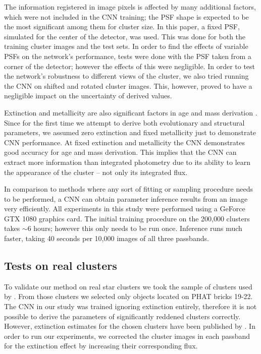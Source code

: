 \documentclass{aa}
\begin{document}
The information registered in image pixels is affected by many additional factors, which were not included in the CNN training; the PSF shape is expected to be the most significant among them for cluster size. In this paper, a fixed PSF, simulated for the center of the detector, was used. This was done for both the training cluster images and the test sets. In order to find the effects of variable PSFs on the network's performance, tests were done with the PSF taken from a corner of the detector; however the effects of this were negligible. In order to test the network's robustness to different views of the cluster, we also tried running the CNN on shifted and rotated cluster images. This, however, proved to have a negligible impact on the uncertainty of derived values.

Extinction and metallicity are also significant factors in age and mass derivation \citep{2014A&A...569A...4D, 2015A&A...574A..66D}. Since for the first time we attempt to derive both evolutionary and structural parameters, we assumed zero extinction and fixed metallicity just to demonstrate CNN performance. At fixed extinction and metallicity the CNN demonstrates good accuracy for age and mass derivation. This implies that the CNN can extract more information than integrated photometry due to its ability to learn the appearance of the cluster -- not only its integrated flux.

In comparison to methods where any sort of fitting or sampling procedure needs to be performed, a CNN can obtain parameter inference results from an image very efficiently. All experiments in this study were performed using a GeForce GTX 1080 graphics card. The initial training procedure on the 200,000 clusters takes $\sim$6 hours; however this only needs to be run once. Inference runs much faster, taking 40 seconds per 10,000 images of all three passbands.

\subsection{Tests on real clusters} \label{sec:real_clusters}
To validate our method on real star clusters we took the sample of clusters used by \cite{2017A&A...602A.112D}. From those clusters we selected only objects located on PHAT bricks 19-22. The CNN in our study was trained ignoring extinction entirely, therefore it is not possible to derive the parameters of significantly reddened clusters correctly. However, extinction estimates for the chosen clusters have been published by \cite{2017A&A...602A.112D}. In order to run our experiments, we corrected the cluster images in each passband for the extinction effect by increasing their corresponding flux.
\end{document}
